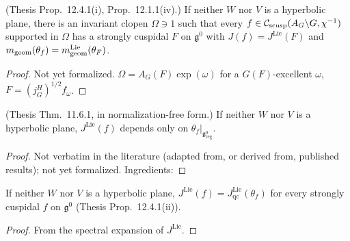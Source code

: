 \begin{lemma}
\label{exists_lie_descent}
\leanok
{}
(Thesis Prop.~12.4.1(i), Prop.~12.1.1(iv).) If neither $W$ nor $V$ is a hyperbolic plane, there is an invariant
clopen $\Omega\ni1$ such that every $f\in\mathcal{C}_{\mathrm{scusp}}(A_G\backslash G,\chi^{-1})$ supported in $\Omega$ has a strongly cuspidal
$F$ on $\mathfrak g^0$ with $J(f)=J^{\mathrm{Lie}}(F)$ and $m_{\mathrm{geom}}(\theta_f)=m^{\mathrm{Lie}}_{\mathrm{geom}}(\theta_F)$.
\end{lemma}
\begin{proof}
Not yet formalized. $\Omega=A_G(F)\exp(\omega)$ for a $G(F)$-excellent $\omega$, $F=(j_G^H)^{1/2}f_\omega$.
\end{proof}

\begin{theorem}
\label{jLie_eq_of_thetaFLie_eqOn}
\leanok
{}
(Thesis Thm.~11.6.1, in normalization-free form.) If neither $W$ nor $V$ is a hyperbolic plane, $J^{\mathrm{Lie}}(f)$
depends only on $\theta_f|_{\mathfrak g^0_{\mathrm{reg}}}$.
\end{theorem}
\begin{proof}
Not verbatim in the literature (adapted from, or derived from, published results); not yet formalized. Ingredients: 
\end{proof}

\begin{lemma}
\label{distribJLie_eq_jqcLie}
\leanok
{}
If neither $W$ nor $V$ is a hyperbolic plane, $J^{\mathrm{Lie}}(f)=J^{\mathrm{Lie}}_{\mathrm{qc}}(\theta_f)$ for every
strongly cuspidal $f$ on $\mathfrak g^0$ (Thesis Prop.~12.4.1(ii)).
\end{lemma}
\begin{proof}
\leanok
{}
From the spectral expansion of $J^{\mathrm{Lie}}$.
\end{proof}

